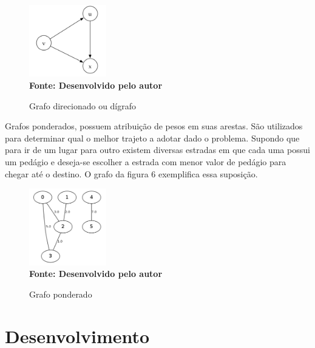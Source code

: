 \begin{figure}[ht]
	\centering	
	\caption[\hspace{0.1cm}Grafo direcionado ou dígrafo.]{Grafo direcionado ou dígrafo}
	\vspace{-0.4cm}
	\includegraphics[width=0.3\textwidth]{figuras/grafo-direcionado.png}
	 \vspace{-0.2cm}
	\\\textbf{\footnotesize Fonte: Desenvolvido pelo autor}
	\label{fig:figura1}
\end{figure}

Grafos ponderados, possuem atribuição de pesos em suas arestas. São utilizados para determinar qual o melhor trajeto a adotar dado o problema. Supondo que para ir de um lugar para outro existem diversas estradas em que cada uma possui um pedágio e deseja-se escolher a estrada com menor valor de pedágio para chegar até o destino. O grafo da figura 6 exemplifica essa suposição.

\begin{figure}[ht]
	\centering	
	\caption[\hspace{0.1cm}Grafo ponderado.]{Grafo ponderado}
	\vspace{-0.4cm}
	\includegraphics[width=0.3\textwidth]{figuras/grafo-ponderado.png}
	 \vspace{-0.2cm}
	\\\textbf{\footnotesize Fonte: Desenvolvido pelo autor}
	\label{fig:figura1}
\end{figure}


\section{\esp Desenvolvimento}

